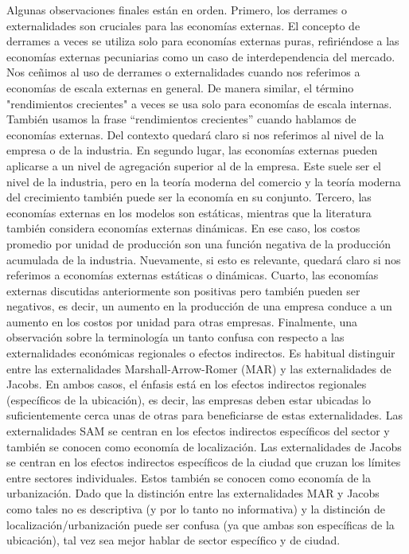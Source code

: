 Algunas observaciones finales están en orden. Primero, los derrames o externalidades son cruciales para las economías externas. El concepto de derrames a veces se utiliza solo para economías externas puras, refiriéndose a las economías externas pecuniarias como un caso de interdependencia del mercado. Nos ceñimos al uso de derrames o externalidades cuando nos referimos a economías de escala externas en general. De manera similar, el término "rendimientos crecientes" a veces se usa solo para economías de escala internas. También usamos la frase “rendimientos crecientes” cuando hablamos de economías externas. Del contexto quedará claro si nos referimos al nivel de la empresa o de la industria. En segundo lugar, las economías externas pueden aplicarse a un nivel de agregación superior al de la empresa. Este suele ser el nivel de la industria, pero en la teoría moderna del comercio y la teoría moderna del crecimiento también puede ser la economía en su conjunto. Tercero, las economías externas en los modelos son estáticas, mientras que la literatura también considera economías externas dinámicas. En ese caso, los costos promedio por unidad de producción son una función negativa de la producción acumulada de la industria. Nuevamente, si esto es relevante, quedará claro si nos referimos a economías externas estáticas o dinámicas. Cuarto, las economías externas discutidas anteriormente son positivas pero también pueden ser negativos, es decir, un aumento en la producción de una empresa conduce a un aumento en los costos por unidad para otras empresas. Finalmente, una observación sobre la terminología un tanto confusa con respecto a las externalidades económicas regionales o efectos indirectos. Es habitual distinguir entre las externalidades Marshall-Arrow-Romer (MAR) y las externalidades de Jacobs. En ambos casos, el énfasis está en los efectos indirectos regionales (específicos de la ubicación), es decir, las empresas deben estar ubicadas lo suficientemente cerca unas de otras para beneficiarse de estas externalidades. Las externalidades SAM se centran en los efectos indirectos específicos del sector y también se conocen como economía de localización. Las externalidades de Jacobs se centran en los efectos indirectos específicos de la ciudad que cruzan los límites entre sectores individuales. Estos también se conocen como economía de la urbanización. Dado que la distinción entre las externalidades MAR y Jacobs como tales no es descriptiva (y por lo tanto no informativa) y la distinción de localización/urbanización puede ser confusa (ya que ambas son específicas de la ubicación), tal vez sea mejor hablar de sector específico y de ciudad.

